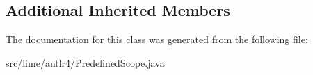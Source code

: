\subsection*{Additional Inherited Members}


The documentation for this class was generated from the following file\+:\begin{DoxyCompactItemize}
\item 
src/lime/antlr4/Predefined\+Scope.\+java\end{DoxyCompactItemize}
